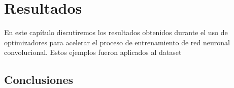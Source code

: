 \chapter{Resultados}
En este capítulo discutiremos los resultados obtenidos durante el uso de optimizadores para acelerar el proceso de entrenamiento de red neuronal convolucional. Estos ejemplos fueron aplicados al dataset 

\section{Conclusiones}
